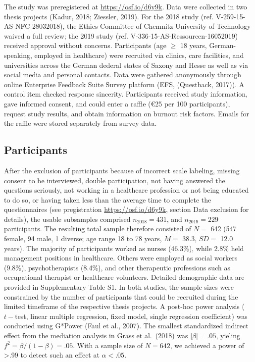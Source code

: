 \documentclass[
  english,
  man]{apa6}
\begin{document}
The study was preregistered at \url{https://osf.io/d6y9k}. Data were collected in two thesis projects (Kadur, 2018; Ziessler, 2019). For the 2018 study (ref. V-259-15-AS-NFC-28032018), the Ethics Committee of Chemnitz University of Technology waived a full review; the 2019 study (ref. V-336-15-AS-Ressourcen-16052019) received approval without concerns. Participants (age \(\ge\) 18 years, German-speaking, employed in healthcare) were recruited via clinics, care facilities, and universities across the German dederal states of Saxony and Hesse as well as via social media and personal contacts. Data were gathered anonymously through online Enterprise Feedback Suite Survey platform (EFS, (Questback, 2017)). A control item checked response sincerity. Participants received study information, gave informed consent, and could enter a raffle (€25 per 100 participants), request study results, and obtain information on burnout risk factors. Emails for the raffle were stored separately from survey data.

\subsection{Participants}\label{participants}

After the exclusion of participants because of incorrect scale labeling, missing consent to be interviewed, double participation, not having answered the questions seriously, not working in a healthcare profession or not being educated to do so, or having taken less than the average time to complete the questionnaires (see pregistration \url{https://osf.io/d6y9k}, section Data exclusion for details), the usable subsamples comprised \(n_{2018}=431\), and \(n_{2019}=229\) participants. The resulting total sample therefore consisted of \(N=\) 642 (547 female, 94 male, 1 diverse; age range 18 to 78 years, \(M=\) 38.3, \(SD=\) 12.0 years).
The majority of participants worked as nurses (46.3\%), while 2.8\% held management positions in healthcare.
Others were employed as social workers (9.8\%), psychotherapists (8.4\%), and other therapeutic professions such as occupational therapist or healthcare volunteers.
Detailed demographic data are provided in Supplementary Table S1.
In both studies, the sample sizes were constrained by the number of participants that could be recruited during the limited timeframe of the respective thesis projects. A post-hoc power analysis (\(t-\)test, linear multiple regression, fixed model, single regression coefficient) was conducted using G*Power (Faul et al., 2007). The smallest standardized indirect effect from the mediation analysis in Grass et al.~(2018) was \(|\beta|=.05\), yieling \(f^2=\beta/(1-\beta)=.05\). With a sample size of \(N=642\), we achieved a power of \textgreater.99 to detect such an effect at \(\alpha<.05\).
\end{document}

